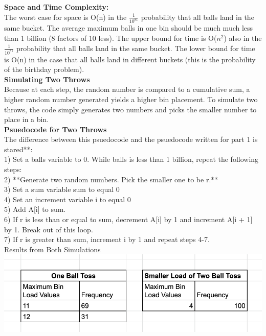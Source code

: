 \documentclass[11pt, solution, letterpaper]{format}
\begin{document}
\textbf{Space and Time Complexity:}\\
The worst case for space is O(n) in the $\frac{1}{10^81}$ probability that all balls land in the same bucket. The average maximum balls in one bin should be much much less than 1 billion (8 factors of 10 less). The upper bound for time is O($n^2$) also in the $\frac{1}{10^81}$ probability that all balls land in the same bucket. The lower bound for time is O(n) in the case that all balls land in different buckets (this is the probability of the birthday problem).\\

\textbf{Simulating Two Throws}\\
Because at each step, the random number is compared to a cumulative sum, a higher random number generated yields a higher bin placement. To simulate two throws, the code simply generates two numbers and picks the smaller number to place in a bin.\\

\textbf{Psuedocode for Two Throws}\\
The difference between this psuedocode and the psuedocode written for part 1 is stared**:\\
1) Set a balls variable to 0. While balls is less than 1 billion, repeat the following steps:\\
2) **Generate two random numbers. Pick the smaller one to be r.**\\
3) Set a sum variable sum to equal 0\\
4) Set an increment variable i to equal 0\\
5) Add A[i] to sum.\\
6) If r is less than or equal to sum, decrement A[i] by 1 and increment A[i + 1] by 1. Break out of this loop.\\
7) If r is greater than sum, increment i by 1 and repeat steps  4-7.\\

Results from Both Simulations\\
\includegraphics[scale=.75]{twoo.png}\\
\end{document}
